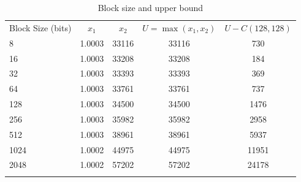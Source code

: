 \begin{table}[htbp!]
\caption{Block size and upper bound}
\label{tab:2}       %
\centering
\begin{tabular}{l|cc|c|c}
\hline\noalign{\smallskip}
Block Size (bits) & $x_1$ & $x_2$ & $U=\max(x_1,x_2)$ & $U-C(128,128)$ \\
\noalign{\smallskip}\hline\noalign{\smallskip}
8	& 1.0003 & 33116 & 33116 & 730\\
16	& 1.0003 & 33208 & 33208 & 184\\
32	& 1.0003 & 33393 & 33393 & 369\\
64	& 1.0003 & 33761 & 33761 & 737\\
128	& 1.0003 & 34500 & 34500 & 1476\\
256	& 1.0003 & 35982 & 35982 & 2958\\
512	& 1.0003 & 38961 & 38961 & 5937\\
1024& 1.0002 & 44975 & 44975 & 11951\\
2048& 1.0002 & 57202 & 57202 & 24178\\
\noalign{\smallskip}\hline
\end{tabular}
\end{table}

